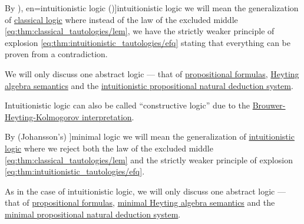 \begin{concept}\label{con:intuitionistic_logic}\mimprovised
  By \term[ru=интуиционисткая логика (\cite[58]{ШеньВерещагин2017ЯзыкиИИсчисления}), en=intuitionistic logic (\cite[8]{TroelstraSchwichtenberg2000BasicProofTheory})]{intuitionistic logic} we will mean the generalization of \hyperref[con:classical_logic]{classical logic} where instead of the law of the excluded middle \eqref{eq:thm:classical_tautologies/lem}, we have the strictly weaker principle of explosion \eqref{eq:thm:intuitionistic_tautologies/efq} stating that everything can be proven from a contradiction.

  We will only discuss one abstract logic --- that of \hyperref[def:propositional_syntax/formula]{propositional formulas}, \hyperref[def:propositional_semantics/intuitionistic]{Heyting algebra semantics} and the \hyperref[def:propositional_natural_deduction_systems]{intuitionistic propositional natural deduction system}.
\end{concept}
\begin{comments}
  \item Intuitionistic logic can also be called \enquote{constructive logic} due to the \hyperref[con:brouwer_heyting_kolmogorov_interpretation]{Brouwer-Heyting-Kolmogorov interpretation}.
\end{comments}

\begin{concept}\label{con:minimal_logic}\mimprovised
  By (Johansson's) \term[en=minimal logic (\cite[1]{VanDerMolen2016MinimalLogic}]{minimal logic} we will mean the generalization of \hyperref[con:intuitionistic_logic]{intuitionistic logic} where we reject both the law of the excluded middle \eqref{eq:thm:classical_tautologies/lem} and the strictly weaker principle of explosion \eqref{eq:thm:intuitionistic_tautologies/efq}.

  As in the case of intuitionistic logic, we will only discuss one abstract logic --- that of \hyperref[def:propositional_syntax/formula]{propositional formulas}, \hyperref[def:minimal_propositional_semantics]{minimal Heyting algebra semantics} and the \hyperref[def:propositional_natural_deduction_systems]{minimal propositional natural deduction system}.
\end{concept}
